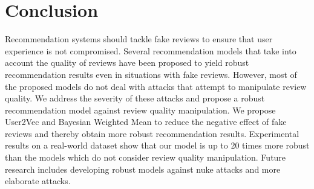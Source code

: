 \documentclass[master,english,final]{kaist-ucs}
\begin{document}
\chapter{Conclusion}
Recommendation systems should tackle fake reviews to ensure that user experience is not compromised.
Several recommendation models that take into account the quality of reviews have been proposed to yield robust recommendation results even in situations with fake reviews.
However, most of the proposed models do not deal with attacks that attempt to manipulate review quality.
We address the severity of these attacks and propose a robust recommendation model against review quality manipulation.
We propose User2Vec and Bayesian Weighted Mean to reduce the negative effect of fake reviews and thereby obtain more robust recommendation results.
Experimental results on a real-world dataset show that our model is up to 20 times more robust than the models which do not consider review quality manipulation.
Future research includes developing robust models against nuke attacks and more elaborate attacks.







\end{document}
